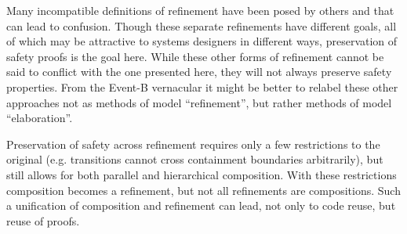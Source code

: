 Many incompatible definitions of refinement have been posed by
others\cite{Syriani_2019,Maraninchi91theargos} and that can lead to
confusion.  Though these separate refinements have different goals,
all of which may be attractive to systems designers in different ways,
preservation of safety proofs is the goal here.  While these other
forms of refinement cannot be said to conflict with the one presented
here, they will not always preserve safety properties.  From the
Event-B vernacular it might be better to relabel these other
approaches not as methods of model ``refinement'', but rather methods
of model ``elaboration''.  

Preservation of safety across refinement requires only a few
restrictions to the original\cite{Harel} \SCs (e.g. transitions cannot
cross containment boundaries arbitrarily), but still allows for both
parallel and hierarchical composition.  With these restrictions
composition becomes a refinement, but not all refinements are
compositions.  Such a unification of composition and refinement can
lead, not only to code reuse, but reuse of proofs.







